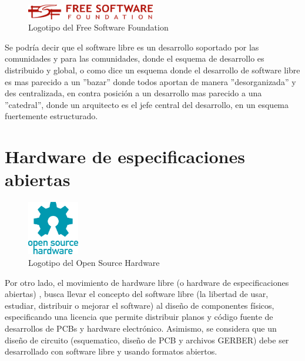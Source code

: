 \begin{figure}
  \begin{center}
    \includegraphics[width=0.5\textwidth]{figuras/fsf.png}
    \caption{Logotipo del Free Software Foundation}
    \label{fig: }
  \end{center}
\end{figure}

Se podría decir que el software libre es un desarrollo soportado por las comunidades y para las comunidades, donde el esquema de desarrollo es distribuido y global, o como dice \citep{raymond_catedral_1998} un esquema donde el desarrollo de software libre es mas parecido a un ''bazar'' donde todos aportan de manera ''desorganizada'' y des centralizada, en contra posición a un desarrollo mas parecido a una ''catedral'', donde un arquitecto es el jefe central del desarrollo, en un esquema fuertemente estructurado.

\section{Hardware de especificaciones abiertas }

\begin{figure}
  \begin{center}
    \includegraphics[width=0.2\textwidth]{figuras/Open-source-hardware-logo.png}
    \caption{Logotipo del Open Source Hardware}
    \label{fig: }
  \end{center}
\end{figure}

Por otro lado, el movimiento de hardware libre (o hardware de especificaciones abiertas) , busca llevar el concepto del software libre (la libertad de usar, estudiar, distribuir o mejorar el software) al diseño de  componentes físicos, especificando una licencia que permite distribuir planos y código fuente de desarrollos de PCBs y hardware electrónico. Asimismo, se considera que un diseño de circuito (esquematico, diseño de PCB y archivos GERBER) debe ser desarrollado con software libre y usando formatos abiertos.

